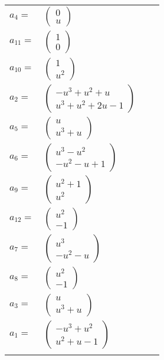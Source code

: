 \documentclass[1p]{elsarticle_modified}
\theoremstyle{definition}
\begin{document}
\begin{tabular}{m{7pt} m{180pt} m{7pt} m{180pt} }
\flushright $a_{4}=$&$\begin{pmatrix}0\\u\end{pmatrix}$ \\
\flushright $a_{11}=$&$\begin{pmatrix}1\\0\end{pmatrix}$ \\
\flushright $a_{10}=$&$\begin{pmatrix}1\\u^2\end{pmatrix}$ \\
\flushright $a_{2}=$&$\begin{pmatrix}- u^3+u^2+u\\u^3+u^2+2 u-1\end{pmatrix}$ \\
\flushright $a_{5}=$&$\begin{pmatrix}u\\u^3+u\end{pmatrix}$ \\
\flushright $a_{6}=$&$\begin{pmatrix}u^3- u^2\\- u^2- u+1\end{pmatrix}$ \\
\flushright $a_{9}=$&$\begin{pmatrix}u^2+1\\u^2\end{pmatrix}$ \\
\flushright $a_{12}=$&$\begin{pmatrix}u^2\\-1\end{pmatrix}$ \\
\flushright $a_{7}=$&$\begin{pmatrix}u^3\\- u^2- u\end{pmatrix}$ \\
\flushright $a_{8}=$&$\begin{pmatrix}u^2\\-1\end{pmatrix}$ \\
\flushright $a_{3}=$&$\begin{pmatrix}u\\u^3+u\end{pmatrix}$ \\
\flushright $a_{1}=$&$\begin{pmatrix}- u^3+u^2\\u^2+u-1\end{pmatrix}$\\&\end{tabular}
\end{document}
